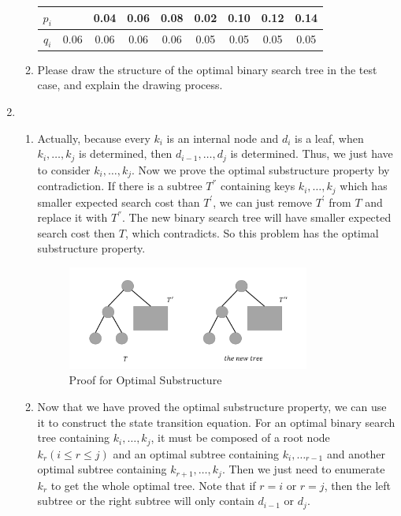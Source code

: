\documentclass[12pt,a4paper]{article}
\makeatletter
\newtheorem*{solution}{Solution}
\theoremstyle{definition}
\renewenvironment{solution}[1][Solution] {\par\pushQED{\qed}\normalfont\topsep6\p@\@plus6\p@\relax\trivlist\item[\hskip\labelsep\bfseries#1\@addpunct{.}]\ignorespaces}{\popQED\endtrivlist\@endpefalse} \makeatother
\makeatother
\begin{document}
\begin{enumerate}
\begin{enumerate}
\begin{table}[H]
\begin{tabular}{|c|cccccccc|}
					\hline
					$ p_{i} $&&0.04&0.06&0.08&0.02&0.10&0.12&0.14\\
					\hline
					$ q_{i} $&0.06&0.06&0.06&0.06&0.05&0.05&0.05&0.05\\
					\hline
				\end{tabular}
			\end{table}
			\item Please draw the structure of the optimal binary search tree in the test case, and explain the drawing process.   
		\end{enumerate}
		\begin{solution}
		    ~
    		\begin{enumerate}
    		    \item Actually, because every $k_i$ is an internal node and $d_i$ is a leaf, when $k_i,\dots,k_{j}$ is determined, then $d_{i-1},\dots,d_j$ is determined. Thus, we just have to consider $k_i,\dots,k_{j}$. Now we prove the optimal substructure property by contradiction. If there is a subtree $T^{''}$ containing keys $k_i,\dots,k_j$ which has smaller expected search cost than $T^{'}$, we can just remove $T^{'}$ from $T$ and replace it with $T^{''}$. The new binary search tree will have smaller expected search cost then $T$, which contradicts. So this problem has the optimal substructure property.
    		    \begin{figure}[htbp]
                \centering \includegraphics[width=0.8\textwidth]{Fig-Subtree.pdf}
                \caption{Proof for Optimal Substructure}\label{Fig-Subtree}
            \end{figure}
                \item Now that we have proved the optimal substructure property, we can use it to construct the state transition equation. For an optimal binary search tree containing $k_i,\dots,k_j$, it must be composed of a root node $k_r(i\leq r\leq j)$ and an optimal subtree containing $k_i,\dots_{r-1}$ and another optimal subtree containing $k_{r+1},\dots,k_j$. Then we just need to enumerate $k_r$ to get the whole optimal tree. Note that if $r = i$ or $r = j$, then the left subtree or the right subtree will only contain $d_{i-1}$ or $d_j$.\\

\end{enumerate}
\end{solution}
\end{enumerate}
\end{document}
